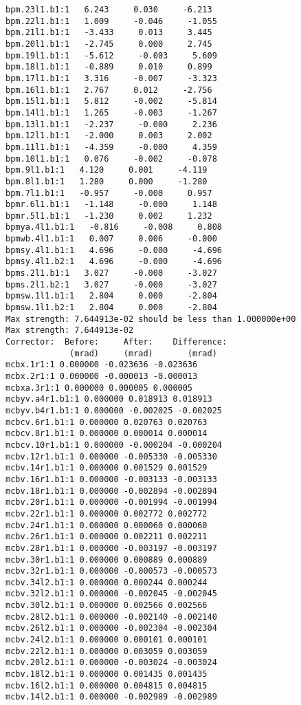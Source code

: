 \begin{verbatim}
bpm.23l1.b1:1   6.243     0.030     -6.213
bpm.22l1.b1:1   1.009     -0.046     -1.055
bpm.21l1.b1:1   -3.433     0.013     3.445
bpm.20l1.b1:1   -2.745     0.000     2.745
bpm.19l1.b1:1   -5.612     -0.003     5.609
bpm.18l1.b1:1   -0.889     0.010     0.899
bpm.17l1.b1:1   3.316     -0.007     -3.323
bpm.16l1.b1:1   2.767     0.012     -2.756
bpm.15l1.b1:1   5.812     -0.002     -5.814
bpm.14l1.b1:1   1.265     -0.003     -1.267
bpm.13l1.b1:1   -2.237     -0.000     2.236
bpm.12l1.b1:1   -2.000     0.003     2.002
bpm.11l1.b1:1   -4.359     -0.000     4.359
bpm.10l1.b1:1   0.076     -0.002     -0.078
bpm.9l1.b1:1   4.120     0.001     -4.119
bpm.8l1.b1:1   1.280     0.000     -1.280
bpm.7l1.b1:1   -0.957     -0.000     0.957
bpmr.6l1.b1:1   -1.148     -0.000     1.148
bpmr.5l1.b1:1   -1.230     0.002     1.232
bpmya.4l1.b1:1   -0.816     -0.008     0.808
bpmwb.4l1.b1:1   0.007     0.006     -0.000
bpmsy.4l1.b1:1   4.696     -0.000     -4.696
bpmsy.4l1.b2:1   4.696     -0.000     -4.696
bpms.2l1.b1:1   3.027     -0.000     -3.027
bpms.2l1.b2:1   3.027     -0.000     -3.027
bpmsw.1l1.b1:1   2.804     0.000     -2.804
bpmsw.1l1.b2:1   2.804     0.000     -2.804
Max strength: 7.644913e-02 should be less than 1.000000e+00
Max strength: 7.644913e-02
Corrector:  Before:     After:    Difference:
             (mrad)     (mrad)       (mrad)  
mcbx.1r1:1 0.000000 -0.023636 -0.023636
mcbx.2r1:1 0.000000 -0.000013 -0.000013
mcbxa.3r1:1 0.000000 0.000005 0.000005
mcbyv.a4r1.b1:1 0.000000 0.018913 0.018913
mcbyv.b4r1.b1:1 0.000000 -0.002025 -0.002025
mcbcv.6r1.b1:1 0.000000 0.020763 0.020763
mcbcv.8r1.b1:1 0.000000 0.000014 0.000014
mcbcv.10r1.b1:1 0.000000 -0.000204 -0.000204
mcbv.12r1.b1:1 0.000000 -0.005330 -0.005330
mcbv.14r1.b1:1 0.000000 0.001529 0.001529
mcbv.16r1.b1:1 0.000000 -0.003133 -0.003133
mcbv.18r1.b1:1 0.000000 -0.002894 -0.002894
mcbv.20r1.b1:1 0.000000 -0.001994 -0.001994
mcbv.22r1.b1:1 0.000000 0.002772 0.002772
mcbv.24r1.b1:1 0.000000 0.000060 0.000060
mcbv.26r1.b1:1 0.000000 0.002211 0.002211
mcbv.28r1.b1:1 0.000000 -0.003197 -0.003197
mcbv.30r1.b1:1 0.000000 0.000889 0.000889
mcbv.32r1.b1:1 0.000000 -0.000573 -0.000573
mcbv.34l2.b1:1 0.000000 0.000244 0.000244
mcbv.32l2.b1:1 0.000000 -0.002045 -0.002045
mcbv.30l2.b1:1 0.000000 0.002566 0.002566
mcbv.28l2.b1:1 0.000000 -0.002140 -0.002140
mcbv.26l2.b1:1 0.000000 -0.002304 -0.002304
mcbv.24l2.b1:1 0.000000 0.000101 0.000101
mcbv.22l2.b1:1 0.000000 0.003059 0.003059
mcbv.20l2.b1:1 0.000000 -0.003024 -0.003024
mcbv.18l2.b1:1 0.000000 0.001435 0.001435
mcbv.16l2.b1:1 0.000000 0.004815 0.004815
mcbv.14l2.b1:1 0.000000 -0.002989 -0.002989

\end{verbatim}
